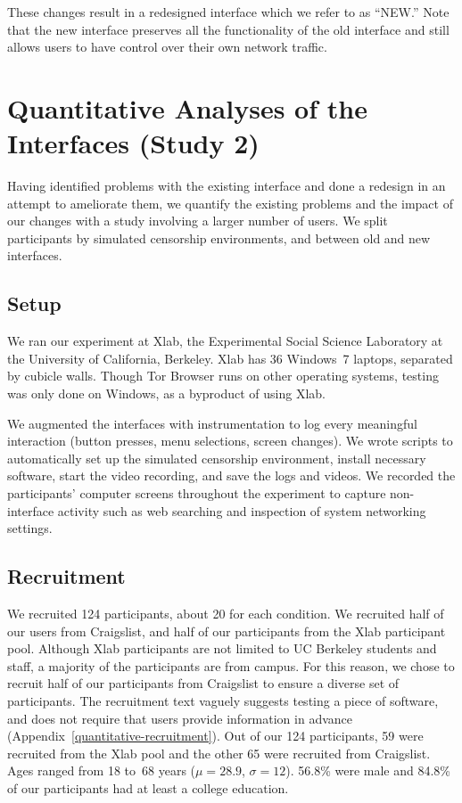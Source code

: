 \documentclass[USenglish,oneside,twocolumn]{article}
\begin{document}
These changes result in a redesigned interface which we refer to as ``NEW.'' Note that the new interface preserves all the functionality of the old interface and still allows users to have control over their own network traffic. 

\section{Quantitative Analyses of the Interfaces (Study 2)}
\label{sec:quantitative}
Having identified problems with the existing interface
and done a redesign in an attempt to ameliorate them,
we quantify the existing problems
and the impact of our changes with a study involving a larger number of users.
We split participants by simulated censorship environments,
and between old and new interfaces.

\subsection{Setup}
We ran our experiment at Xlab, the Experimental Social Science Laboratory at the University of 
California, Berkeley. Xlab has 36 Windows~7 laptops, separated by cubicle walls. 
Though Tor Browser runs on other operating systems,
testing was only done on Windows, as a byproduct of using Xlab. 

We augmented the interfaces with instrumentation 
to log every meaningful interaction
(button presses, menu selections, screen changes).
We wrote scripts to automatically set up the simulated censorship environment, install necessary software, 
start the video recording, and save the logs and videos.
We recorded the participants' computer screens
throughout the experiment to capture non-interface activity such as 
web searching and inspection of system networking settings.

\subsection{Recruitment}
We recruited 124 participants, about 20 for each
condition. We recruited half of our users from Craigslist, and half of our participants from 
the Xlab participant pool. Although Xlab participants are not limited to UC Berkeley students and staff,
a majority of the participants are from campus. For this reason, we chose to recruit 
half of our participants from Craigslist to ensure a diverse set of participants. 
The recruitment text vaguely suggests testing a piece of software, and does not require
that users provide information in advance (Appendix~\ref{quantitative-recruitment}). 
Out of our 124 participants, 59 were recruited from the Xlab pool and the other 65 were
recruited from Craigslist. Ages ranged from 18 to~68 years
($\mu = 28.9$, $\sigma = 12$). 56.8\% were male and 
84.8\% of our participants had at least a college education.
\end{document}
